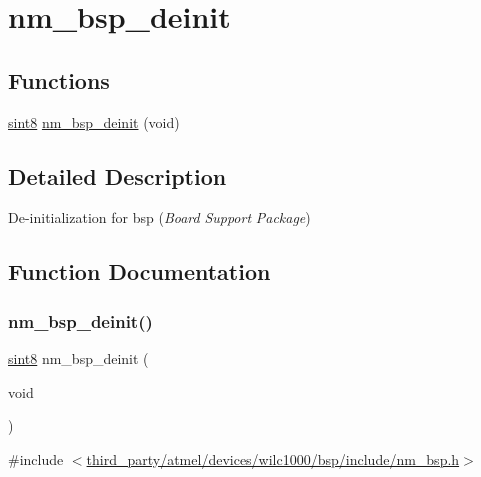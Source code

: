 \hypertarget{group__NmBspDeinitFn}{}\section{nm\+\_\+bsp\+\_\+deinit}
\label{group__NmBspDeinitFn}
\subsection*{Functions}
\begin{DoxyCompactItemize}
\item 
\hyperlink{group__DataT_gae35f10ffd0ac8dd2bc3e794da9bdfbc7}{sint8} \hyperlink{group__NmBspDeinitFn_ga21908c77ace36b999e63edf95751b1d0}{nm\+\_\+bsp\+\_\+deinit} (void)
\end{DoxyCompactItemize}


\subsection{Detailed Description}
De-\/initialization for bsp ({\itshape Board} {\itshape Support} {\itshape Package}) 

\subsection{Function Documentation}
\mbox{\label{group__NmBspDeinitFn_ga21908c77ace36b999e63edf95751b1d0}} 
\subsubsection{\texorpdfstring{nm\+\_\+bsp\+\_\+deinit()}{nm\_bsp\_deinit()}}
{\footnotesize\ttfamily \hyperlink{group__DataT_gae35f10ffd0ac8dd2bc3e794da9bdfbc7}{sint8} nm\+\_\+bsp\+\_\+deinit (\begin{DoxyParamCaption}\item[{void}]{ }\end{DoxyParamCaption})}



{\ttfamily \#include $<$\hyperlink{nm__bsp_8h}{third\+\_\+party/atmel/devices/wilc1000/bsp/include/nm\+\_\+bsp.\+h}$>$}

